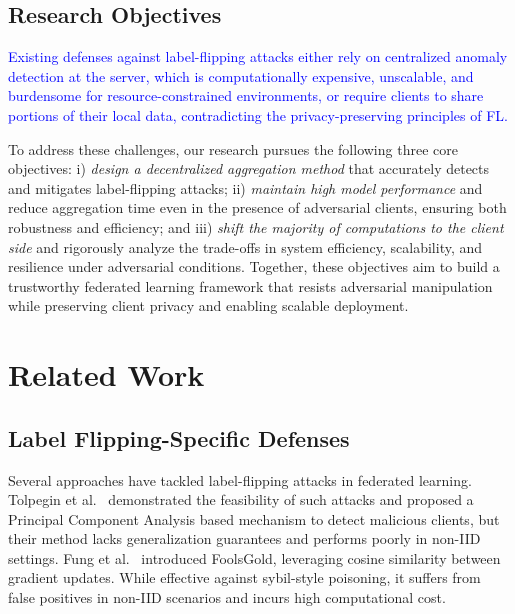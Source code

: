 \documentclass[conference]{IEEEtran}
\begin{document}
\subsection{Research Objectives}
\textcolor{blue}{Existing defenses against label-flipping attacks either rely on centralized anomaly detection at the server, which is \textcolor{blue}{computationally expensive, unscalable, and burdensome for resource-constrained environments}, or require clients to share portions of their local data, \textcolor{blue}{contradicting the privacy-preserving principles of FL}.}

To address these challenges, our research pursues the following three core objectives: i) \textit{design a decentralized aggregation method} that accurately detects and mitigates label-flipping attacks; ii) \textit{maintain high model performance} and reduce aggregation time even in the presence of adversarial clients, ensuring both robustness and efficiency; and iii) \textit{shift the majority of computations to the client side} and rigorously analyze the trade-offs in system efficiency, scalability, and resilience under adversarial conditions. Together, these objectives aim to build a trustworthy federated learning framework that resists adversarial manipulation while preserving client privacy and enabling scalable deployment.


\section{Related Work}
\label{sec:relatedworks}

\subsection{Label Flipping-Specific Defenses}
Several approaches have tackled label-flipping attacks in federated learning. Tolpegin et al.~\cite{tolpegin2020data} demonstrated the feasibility of such attacks and proposed a Principal Component Analysis based mechanism to detect malicious clients, but their method lacks generalization guarantees and performs poorly in non-IID settings. Fung et al.~\cite{fung2020limitations} introduced FoolsGold, leveraging cosine similarity between gradient updates. While effective against sybil-style poisoning, it suffers from false positives in non-IID scenarios and incurs high computational cost. 
\end{document}
